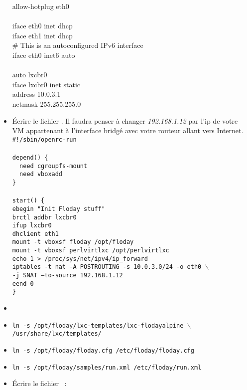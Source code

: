 \begin{itemize}
{allow-hotplug eth0\\
\\
iface eth0 inet dhcp\\
iface eth1 inet dhcp\\
\# This is an autoconfigured IPv6 interface\\
iface eth0 inet6 auto\\
\\
auto lxcbr0\\
iface lxcbr0 inet static\\
	address 10.0.3.1\\
	netmask 255.255.255.0\\
		}
	\item Écrire le fichier .
	Il faudra penser à changer \emph{192.168.1.12} par l'ip de votre VM appartenant à l'interface bridgé avec votre routeur allant vers Internet.\\
	{\tt \#!/sbin/openrc-run\\
\\
depend() \{\\
	~~need cgroupfs-mount\\
	~~need vboxadd\\
\}\\
\\
start() \{\\
	ebegin "Init Floday stuff"\\
	brctl addbr lxcbr0\\
	ifup lxcbr0\\
	dhclient eth1\\
	mount -t vboxsf floday /opt/floday\\
	mount -t vboxsf perlvirtlxc /opt/perlvirtlxc\\
	echo 1 > /proc/sys/net/ipv4/ip\_forward\\
	iptables -t nat -A POSTROUTING -s 10.0.3.0/24 -o eth0 $\backslash$\\
	-j SNAT --to-source 192.168.1.12\\
	eend 0\\
	\}
}
	\item {}
	\item {\tt ln -s /opt/floday/lxc-templates/lxc-flodayalpine $\backslash$\\ /usr/share/lxc/templates/}
	\item {\tt ln -s /opt/floday/floday.cfg /etc/floday/floday.cfg}
	\item {\tt ln -s /opt/floday/samples/run.xml /etc/floday/run.xml}
	\item Écrire le fichier ~:

\end{itemize}
